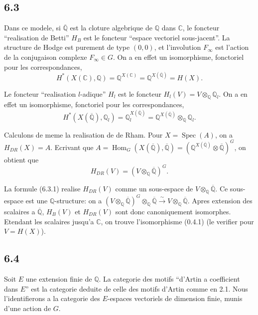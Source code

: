 \documentclass[12pt,a4paper]{article}
\theoremstyle{plain}
\theoremstyle{definition}
\theoremstyle{remark}
\DeclareMathOperator{\Hom}{Hom}
\DeclareMathOperator{\Spec}{Spec}
\newcommand{\Q}{\mathbb{Q}}
\newcommand{\C}{\mathbb{C}}
\begin{document}
\subsection*{6.3}

Dans ce modele, si $\overline{\Q}$ est la cloture algebrique de $\Q$ dans $\C$, le foncteur
``realisation de Betti'' $H_B$ est le foncteur ``espace vectoriel sous-jacent''. La structure
de Hodge est purement de type $(0,0)$, et l'involution $F_\infty$ est l'action de la
conjugaison complexe $F_\infty \in G$. On a en effet un isomorphisme, fonctoriel pour les
correspondances,
\[
H^*(X(\C), \Q) = \Q^{X(\C)} = \Q^{X(\overline{\Q})} = H(X).
\]

Le foncteur ``realisation $l$-adique'' $H_l$ est le foncteur $H_l(V) = V \otimes_\Q \Q_l$.
On a en effet un isomorphisme, fonctoriel pour les correspondances,
\[
H^*(X(\overline{\Q}), \Q_l) = \Q_l^{X(\overline{\Q})} = \Q^{X(\overline{\Q})} \otimes_\Q \Q_l.
\]

Calculons de meme la realisation de de Rham. Pour $X = \Spec(A)$, on a
$H_{DR}(X) = A$. Ecrivant que $A = \Hom_G(X(\overline{\Q}), \overline{\Q}) = (\Q^{X(\overline{\Q})} \otimes \overline{\Q})^G$,
on obtient que
\begin{equation}\label{eq:6.3.1}
H_{DR}(V) = (V \otimes_\Q \overline{\Q})^G.
\end{equation}

La formule (6.3.1) realise $H_{DR}(V)$ comme un sous-espace de $V \otimes_\Q \overline{\Q}$. Ce sous-
espace est une $\Q$-structure: on a $(V \otimes_\Q \overline{\Q})^G \otimes_\Q \overline{\Q} \xrightarrow{\sim} V \otimes_\Q \overline{\Q}$.
Apres extension des scalaires a $\overline{\Q}$, $H_B(V)$ et $H_{DR}(V)$ sont donc canoniquement
isomorphes. Etendant les scalaires jusqu'a $\C$, on trouve l'isomorphisme (0.4.1) (le
verifier pour $V = H(X)$).

\subsection*{6.4}

Soit $E$ une extension finie de $\Q$. La categorie des motifs ``d'Artin a coefficient
dans $E$'' est la categorie deduite de celle des motifs d'Artin comme en 2.1. Nous
l'identifierons a la categorie des $E$-espaces vectoriels de dimension finie, munis
d'une action de $G$.
\end{document}
